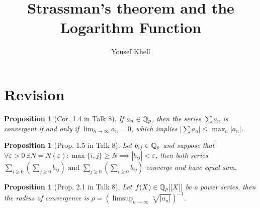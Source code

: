 \documentclass[a4paper]{article}
\title{\vspace{-2cm}Strassman's theorem and the Logarithm Function}
\author{Yousef Khell}
\theoremstyle{plain}
\newtheorem{prop}[thm]{Proposition}
\theoremstyle{definition}
\begin{document}
\section{Revision}
\begin{prop}[Cor. 1.4 in Talk 8]
  If $a_{n} \in \Bbb Q_{p}$, then the series $\sum a_{n}$ is convergent if and only if $\lim_{n \to \infty}a_{n} = 0$, which implies $\left | \sum a_{n} \right| \leq \max_{n}|a_{n}|$.
\end{prop}
\begin{prop}[Prop. 1.5 in Talk 8]
  Let $b_{ij} \in \Bbb Q_{p}$ and suppose that $\forall \varepsilon > 0\ \exists N = N(\varepsilon) : \max\{i,j\} \geq N \implies |b_{ij}| < \varepsilon$, then both series
  $\sum_{i \geq 0}\left(\sum_{j \geq 0} b_{ij} \right) \text{ and } \sum_{j \geq 0}\left(\sum_{i\geq 0} b_{ij} \right)$
  converge and have equal sum.
\end{prop}
\begin{prop}[Prop. 2.1 in Talk 8]
  Let $f(X) \in \Bbb Q_{p}[[X]]$ be a power series, then the radius of convergence is
  $\rho = \left(\limsup_{n \to \infty}\sqrt[n]{|a_{n}|}\right)^{-1}$.
\end{prop}
\end{document}
